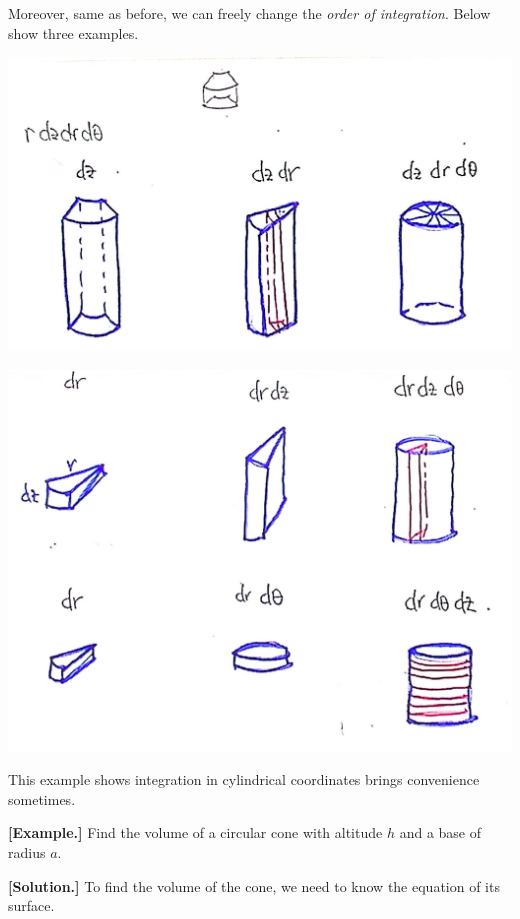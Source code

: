 \documentclass[11pt, a4paper]{MATH2023}
\newcommand{\eg}{\textbf{[Example.] }}
\newcommand{\sol}{\textbf{[Solution.] }}
\begin{document}
\begin{spacing}{1.3}
    \newpage
    Moreover, same as before, we can freely change the {\it order of integration}.
    Below show three examples.
    \begin{center}
        \includegraphics[scale=0.20]{images/Ch14-int-cylind-ways-1.JPG}

        \includegraphics[scale=0.17]{images/Ch14-int-cylind-ways-2.JPG}
    \end{center}

    \newpage
    {\blue This example shows integration in cylindrical coordinates brings convenience sometimes.}

    \eg Find the volume of a circular cone with altitude $h$ and a base of radius $a$.
    
    \sol To find the volume of the cone, we need to know the equation of its surface.


\end{spacing}
\end{document}
